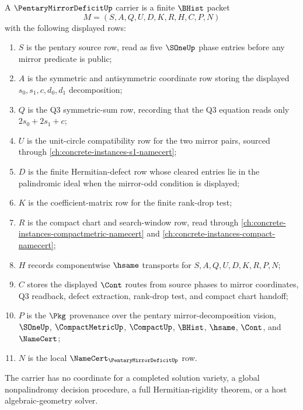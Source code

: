 \begin{definition}
\label{def:pentary-mirror-deficit-carrier}
A $\PentaryMirrorDeficitUp$ carrier is a finite $\BHist$ packet
$$
M=(S,A,Q,U,D,K,R,H,C,P,N)
$$
with the following displayed rows:
\begin{enumerate}
\item $S$ is the pentary source row, read as five $\SOneUp$ phase entries before any mirror predicate is public;
\item $A$ is the symmetric and antisymmetric coordinate row storing the displayed $s_0,s_1,c,d_0,d_1$ decomposition;
\item $Q$ is the Q3 symmetric-sum row, recording that the Q3 equation reads only $2s_0+2s_1+c$;
\item $U$ is the unit-circle compatibility row for the two mirror pairs, sourced through \autoref{ch:concrete-instances-s1-namecert};
\item $D$ is the finite Hermitian-defect row whose cleared entries lie in the palindromic ideal when the mirror-odd condition is displayed;
\item $K$ is the coefficient-matrix row for the finite rank-drop test;
\item $R$ is the compact chart and search-window row, read through \autoref{ch:concrete-instances-compactmetric-namecert} and \autoref{ch:concrete-instances-compact-namecert};
\item $H$ records componentwise $\hsame$ transports for $S,A,Q,U,D,K,R,P,N$;
\item $C$ stores the displayed $\Cont$ routes from source phases to mirror coordinates, Q3 readback, defect extraction, rank-drop test, and compact chart handoff;
\item $P$ is the $\Pkg$ provenance over the pentary mirror-decomposition vision, $\SOneUp$, $\CompactMetricUp$, $\CompactUp$, $\BHist$, $\hsame$, $\Cont$, and $\NameCert$;
\item $N$ is the local $\NameCert_{\PentaryMirrorDeficitUp}$ row.
\end{enumerate}
The carrier has no coordinate for a completed solution variety, a global nonpalindromy decision procedure, a full Hermitian-rigidity theorem, or a host algebraic-geometry solver.
\end{definition}

